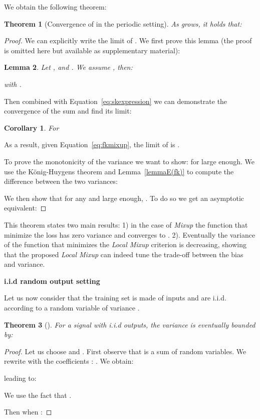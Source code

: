 \documentclass[twoside]{article}
\newtheorem{theorem}{Theorem}[section]
\newtheorem{corollary}{Corollary}[theorem]
\newtheorem{lemma}[theorem]{Lemma}
\numberwithin{intassumption}{assumption}
\begin{document}
We obtain the following theorem:

\begin{theorem}[Convergence of  in the periodic setting]
As  grows, it holds that:
    
\end{theorem}
\begin{proof}
We can explicitly write the limit of . We first prove this lemma (the proof is omitted here but available as supplementary material):
\begin{lemma}
Let ,  and . We assume , then:
    
with .
\end{lemma} 

Then combined with Equation~\eqref{eq:skexpression} we can demonstrate the convergence of the sum  and find its limit:
\begin{corollary}
    For 
    
\end{corollary}

As a result, given Equation~\eqref{eq:fkmixup}, the limit of  is .

To prove the monotonicity of the variance we want to show:  for  large enough. We use the König-Huygens theorem and Lemma~\ref{lemmaE(fk)} to compute the difference between the two variances:

We then show that for any  and  large enough, . To do so we get an asymptotic equivalent: 
\end{proof}

This theorem states two main results: 1) in the case of \emph{Mixup} the function that minimize the loss  has zero variance and converges to . 2). Eventually the variance of the function that minimizes the \emph{Local Mixup} criterion is decreasing, showing that the proposed \emph{Local Mixup} can indeed tune the trade-off between the bias and variance.

\textbf{i.i.d random output setting}

Let us now consider that the training set is made of inputs  and  are i.i.d. according to a random variable  of variance .

\begin{theorem}[]
For a signal with i.i.d outputs, the variance is eventually bounded by:


\end{theorem}

\begin{proof}
Let us choose  and . First observe that  is a sum of random variables. 
We rewrite  with the coefficients : . We obtain:

leading to:

We use the fact that .

Then when :
 
\end{proof}
\end{document}
